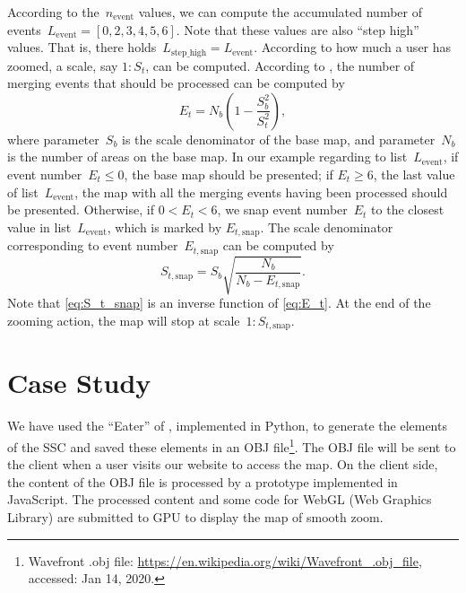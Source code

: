 \documentclass[ijgi,article,submit,moreauthors,pdftex]{Definitions/mdpi}
\begin{document}
According to the~$n_\mathrm{event}$ values,
we can compute the accumulated number of events~$L_\mathrm{event} = 
[0, 2, 3, 4, 5, 6]$.
Note that these values are also ``step high'' values.
That is, there holds~$L_\mathrm{step\_high} = L_\mathrm{event}$.
According to how much a user has zoomed,
a scale, say $1:S_t$, can be computed.
According to \citet{Huang2016Webmap},
the number of merging events that should be processed can be computed by
\begin{equation}
\label{eq:E_t}
E_t = N_b \left(1-\frac{S^2_b}{S^2_t}\right),
\end{equation}
where parameter~$S_b$ is the scale denominator of the base map,
and parameter~$N_b$ is the number of areas on the base map.
In our example regarding to list~$L_\mathrm{event}$,
if event number~$E_t \le 0$, the base map should be presented;
if $E_t \ge 6$, the last value of list~$L_\mathrm{event}$,
the map with all the merging events having been processed
should be presented.
Otherwise, if $0<E_t < 6$, we snap event number~$E_t$ 
to the closest value in list~$L_\mathrm{event}$,
which is marked by $E_{t,\mathrm{snap}}$.
The scale denominator corresponding to event number~$E_{t,\mathrm{snap}}$
can be computed by 
\begin{equation}
\label{eq:S_t_snap}
S_{t,\mathrm{snap}} = S_b \sqrt{\frac{N_b}{N_b-E_{t,\mathrm{snap}}}}.
\end{equation}
Note that \eq\ref{eq:S_t_snap} is an inverse function of \eq\ref{eq:E_t}.
At the end of the zooming action, 
the map will stop at scale~$1:S_{t,\mathrm{snap}}$.




\section{Case Study}
\label{sec:case_study}

We have used the ``Eater'' of \citet{Suba2014Merge},
implemented in Python, 
to generate the elements of the SSC \citep{vanOosterom2014tGAPSSC} 
and saved these elements in an OBJ file\footnote{%
Wavefront .obj file:
\url{https://en.wikipedia.org/wiki/Wavefront_.obj_file},
accessed: Jan 14, 2020.}.
%
The OBJ file will be sent to the client 
when a user visits our website to access the map.
On the client side,
the content of the OBJ file is processed
by a prototype implemented in JavaScript.
The processed content and some code for WebGL (Web Graphics Library)
are submitted to GPU to display the map of smooth zoom.
\end{document}
